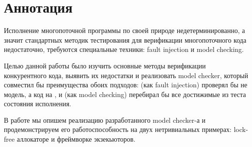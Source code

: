\chapter*{Аннотация}

Исполнение многопоточной программы по своей природе недетерминированно, а значит стандартных методик тестирования для верификации многопоточного кода недостаточно, требуются специальные техники: fault injection и model checking.

Целью данной работы было изучить основные методы верификации конкурентного кода, выявить их недостатки и реализовать model checker, который совместил бы преимущества обоих подходов: (как fault injection) проверял бы не модель, а код на \CC, и (как model checking) перебирал бы все достижимые из теста состояния исполнения.

В работе мы опишем реализацию разработанного model checker-а и продемонстрируем его работоспособность на двух нетривиальных примерах: lock-free аллокаторе и фреймворке экзекьюторов.
